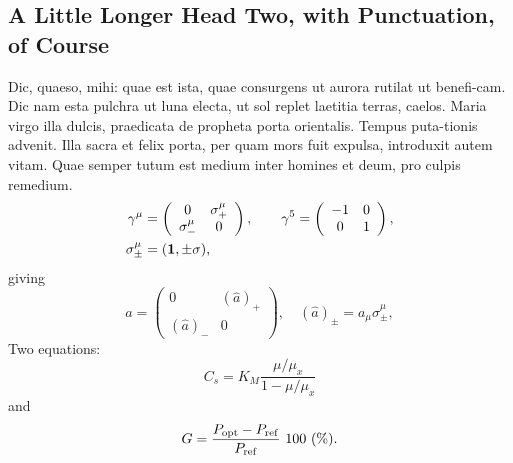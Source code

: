 \documentclass{sili}
\begin{document}
\subsection{A Little Longer Head Two, with Punctuation, of Course}

Dic, quaeso, mihi: quae est ista, quae consurgens ut aurora rutilat
ut benefi-cam.  Dic nam esta pulchra ut luna electa, ut sol replet
laetitia terras, caelos.  Maria virgo illa dulcis, praedicata de
propheta porta orientalis. Tempus puta-tionis advenit. Illa sacra et
felix porta, per quam mors fuit expulsa, introduxit autem vitam. Quae
semper tutum est medium inter homines et deum, pro culpis remedium.
%
\begin{align}
\gamma^\mu & =
\left(
%
\begin{array}{cc}
0            & \sigma^\mu_+ \\
\sigma^\mu_- & 0            
\end{array}
%
\right),
\qquad
\gamma^5= \left(
%
\begin{array}{cc}
-1 & 0 \\
0  & 1
\end{array}
%
\right),\nonumber\\
\sigma^\mu_{\pm} & = ({\bf1} ,\pm\sigma) , \nonumber
\end{align}
%
giving
%
\begin{equation}
\hat a= \left(
%
\begin{array}{cc}
0          & (\hat a)_+ \\
(\hat a)_- & 0
\end{array}
%
\right),\quad(\hat a)_\pm=a_\mu\sigma^\mu_\pm,
\end{equation}
%
Two equations:
%
\begin{equation}
C_{s} = K_{M} \frac{\mu/\mu_{x}}{1-\mu/\mu_{x}} \label{ccs}
\end{equation}
%
and
%
\begin{equation}
G = \frac{P_{\rm opt} - P_{\rm ref}}{P_{\rm ref}}\ 100\ (\%).
\end{equation}
\end{document}
